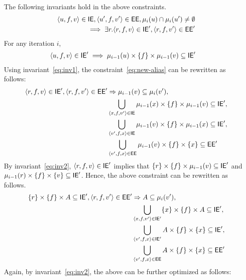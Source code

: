 \documentclass[12pt]{article}
\begin{document}
The following invariants hold in the above constraints.
%
\begin{align}
\nonumber
\langle u,f,v \rangle \in \mathsf{IE}, \langle u',f,v' \rangle \in \mathsf{EE},\mu_{i}(u) \cap \mu_{i}(u') \ne \emptyset \\
\qquad \implies \exists r. \langle r,f,v \rangle \in \mathsf{IE}', \langle r,f,v' \rangle \in \mathsf{EE}' \label{eq:inv1}
\end{align}
%
For any iteration $i$,
\begin{align}
\langle u,f,v \rangle \in \mathsf{IE}' & \implies \mu_{i-1}(u) \times \{ f \} \times \mu_{i-1}(v) \subseteq \mathsf{IE}' \label{eq:inv2}
\end{align}
%
Using invariant~\ref{eq:inv1}, the constraint~\ref{eq:new-alias} can be rewritten as follows:
%
\begin{align}
\nonumber
\langle r,f,v \rangle \in \mathsf{IE}', \langle r,f,v' \rangle \in \mathsf{EE}' 
						 & \Rightarrow \mu_{i-1}(v) \subseteq \mu_i(v'),  \\
\nonumber
& \bigcup_{\langle x,f,v' \rangle \in \mathsf{IE}} \mu_{i-1}(x) \times \{ f \} \times \mu_{i-1}(v) \subseteq \mathsf{IE}', \\
\nonumber
& \bigcup_{\langle v',f,x \rangle \in \mathsf{IE}} \mu_{i-1}(v) \times \{ f \} \times \mu_{i-1}(x) \subseteq \mathsf{IE}', \\
& \bigcup_{\langle v',f,x \rangle \in \mathsf{EE}} \mu_{i-1}(v) \times \{ f \} \times \{  x \} \subseteq \mathsf{EE}' 
\end{align}
%
By invariant~\ref{eq:inv2}, $\langle r,f,v \rangle \in \mathsf{IE}'$ implies that 
$\{ r \} \times \{ f \} \times \mu_{i-1}(v) \subseteq \mathsf{IE}'$ and 
$\mu_{i-1}(r) \times \{ f \} \times \{ v \} \subseteq \mathsf{IE}'$.
Hence, the above constraint can be rewritten as follows.
%
\begin{align}
\nonumber
 \{ r \} \times \{ f \} \times A \subseteq \mathsf{IE}', \langle r,f,v' \rangle \in \mathsf{EE}' 
						 & \Rightarrow A \subseteq \mu_i(v'),  \\
\nonumber
& \bigcup_{\langle x,f,v' \rangle \in \mathsf{IE}'} \{ x \} \times \{ f \} \times A \subseteq \mathsf{IE}', \\
\nonumber
& \bigcup_{\langle v',f,x \rangle \in \mathsf{IE}'} A \times \{ f \} \times \{ x \} \subseteq \mathsf{IE}', \\
& \bigcup_{\langle v',f,x \rangle \in \mathsf{EE}} A \times \{ f \} \times \{  x \} \subseteq \mathsf{EE}' 
\end{align}
%
Again, by invariant~\ref{eq:inv2}, the above can be further optimized as follows:
%
\end{document}
